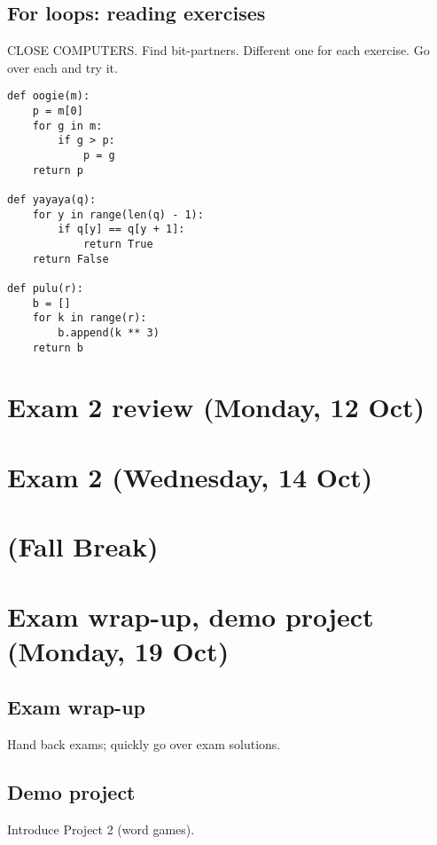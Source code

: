 \documentclass{article}
\begin{document}
\subsection*{For loops: reading exercises}

CLOSE COMPUTERS.
Find bit-partners. Different one for each exercise.
Go over each and try it.

\begin{verbatim}
def oogie(m):
    p = m[0]
    for g in m:
        if g > p:
            p = g
    return p

def yayaya(q):
    for y in range(len(q) - 1):
        if q[y] == q[y + 1]:
            return True
    return False

def pulu(r):
    b = []
    for k in range(r):
        b.append(k ** 3)
    return b
\end{verbatim}

\section*{Exam 2 review (Monday, 12 Oct)}

\section*{Exam 2 (Wednesday, 14 Oct)}

\section*{(Fall Break)}

\section*{Exam wrap-up, demo project (Monday, 19 Oct)}

\subsection{Exam wrap-up}

Hand back exams; quickly go over exam solutions.

\subsection{Demo project}

Introduce Project 2 (word games).
\end{document}
